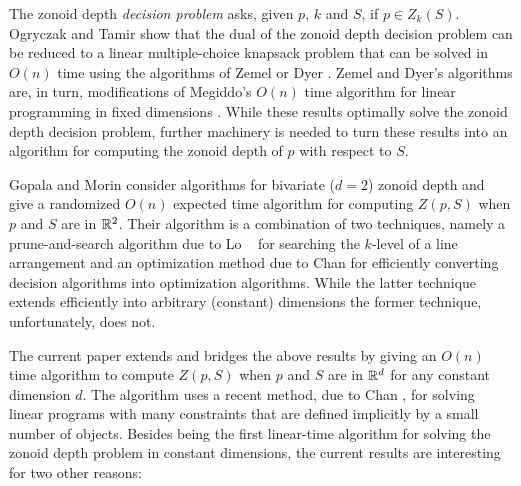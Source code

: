 \documentclass[lotsofwhite]{patmorin}
\begin{document}
The zonoid depth \emph{decision problem} asks, given $p$, $k$ and $S$,
if $p\in Z_k(S)$. Ogryczak and Tamir \cite{ot03} show that the dual of
the zonoid depth decision problem can be reduced to a linear
multiple-choice knapsack problem that can be solved in $O(n)$ time
using the algorithms of Zemel \cite{z84} or Dyer \cite{d84}.  Zemel
and Dyer's algorithms are, in turn, modifications of Megiddo's $O(n)$
time algorithm for linear programming in fixed dimensions
\cite{m83,m84}. While these results optimally solve the zonoid depth
decision problem, further machinery is needed to turn these results into
an algorithm for computing the zonoid depth of $p$ with respect to
$S$.

Gopala and Morin \cite{gm06} consider algorithms for bivariate ($d=2$)
zonoid depth and give a randomized $O(n)$ expected time algorithm for
computing $Z(p,S)$ when $p$ and $S$ are in $\mathbb{R}^2$.  Their algorithm is
a combination of two techniques, namely a prune-and-search algorithm
due to Lo \etal\ \cite{lms94} for searching the $k$-level of a line
arrangement and an optimization method due to Chan \cite{c99} for
efficiently converting decision algorithms into optimization
algorithms.   While the latter technique extends efficiently into
arbitrary (constant) dimensions \cite{c04} the former technique,
unfortunately, does not.

The current paper extends and bridges the above results by giving an
$O(n)$ time algorithm to compute $Z(p,S)$ when $p$ and $S$ are in
$\mathbb{R}^d$ for any constant dimension $d$.  The algorithm uses a recent
method, due to Chan \cite{c04}, for solving linear programs with many
constraints that are defined implicitly by a small number of objects.
Besides being the first linear-time algorithm for solving the zonoid
depth problem in constant dimensions, the current results are
interesting for two other reasons:
\end{document}
